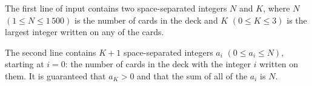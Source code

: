 
The first line of input contains two space-separated integers $N$ and $K$, where $N$ $(1 \leq N \leq 1\,500)$ is the number of cards in the deck and $K$ $(0 \leq K \leq 3)$ is the largest integer written on any of the cards.

The second line contains $K+1$ space-separated integers $a_i$ $(0 \leq a_i \leq N)$, starting at $i=0$: the number of cards in the deck with the integer $i$ written on them. It is guaranteed that $a_K > 0$ and that the sum of all of the $a_i$ is $N$.

